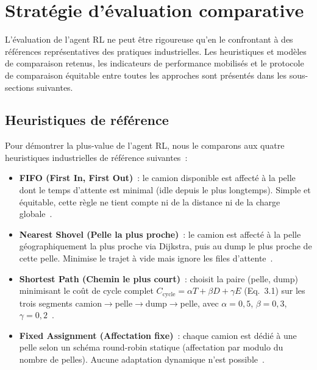 \documentclass[11pt,a4paper]{report}
\begin{document}
\section{Stratégie d'évaluation comparative}
\label{sec:strategie-evaluation}

L'évaluation de l'agent RL ne peut être rigoureuse qu'en le confrontant à des références représentatives des pratiques industrielles. Les heuristiques et modèles de comparaison retenus, les indicateurs de performance mobilisés et le protocole de comparaison équitable entre toutes les approches sont présentés dans les sous-sections suivantes.

\subsection{Heuristiques de référence}
\label{sec:heuristiques-reference}
Pour démontrer la plus-value de l'agent RL, nous le comparons aux 
quatre heuristiques industrielles de référence suivantes~:

\begin{itemize}
    \item \textbf{FIFO (First In, First Out)}~: le camion disponible est affecté à la pelle dont le temps d'attente est minimal (idle depuis le plus longtemps). Simple et équitable, cette règle ne tient compte ni de la distance ni de la charge globale~\cite{Alarie2002}.

    \item \textbf{Nearest Shovel (Pelle la plus proche)}~: le camion est affecté à la pelle géographiquement la plus proche via Dijkstra, puis au dump le plus proche de cette pelle. Minimise le trajet à vide mais ignore les files d'attente~\cite{Alarie2002}.

    \item \textbf{Shortest Path (Chemin le plus court)}~: choisit la paire (pelle, dump) minimisant le coût de cycle complet $C_{\text{cycle}} = \alpha T + \beta D + \gamma E$ (Eq.~3.1) sur les trois segments camion$\to$pelle$\to$dump$\to$pelle, avec $\alpha=0{,}5$, $\beta=0{,}3$, $\gamma=0{,}2$~\cite{Alarie2002}.

    \item \textbf{Fixed Assignment (Affectation fixe)}~: chaque camion est dédié à une pelle selon un schéma round-robin statique (affectation par modulo du nombre de pelles). Aucune adaptation dynamique n'est possible~\cite{MohanMunirathinam1994}.

\end{itemize}
\end{document}
